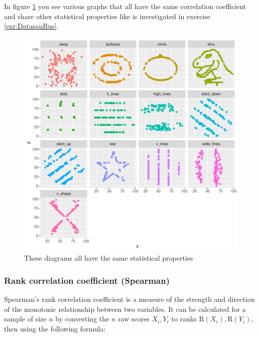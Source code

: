 \documentclass[
  12pt,
  oneside]{book}
\theoremstyle{definition}
\theoremstyle{definition}
\theoremstyle{definition}
\theoremstyle{definition}
\theoremstyle{remark}
\begin{document}
In figure \ref{fig:allcorsame} you see various graphs that all have the same correlation coefficient and share other statistical properties like is investigated in exercise \ref{exr:DatasauRus}.

\begin{figure}

{\centering \includegraphics{fig/allcorsame} 

}

\caption{These diagrams all have the same statistical properties\protect\footnotemark}\label{fig:allcorsame}
\end{figure}

\hypertarget{rank-correlation-coefficient-spearman}{%
\subsubsection{Rank correlation coefficient (Spearman)}\label{rank-correlation-coefficient-spearman}}

Spearman's rank correlation coefficient is a measure of the strength and direction of the monotonic relationship between two variables.
It can be calculated for a sample of size \(n\) by converting the \(n\) raw scores \(X_i, Y_i\) to ranks \(\text{R}(X_i), \text{R}(Y_i)\), then using the following formula:
\end{document}
